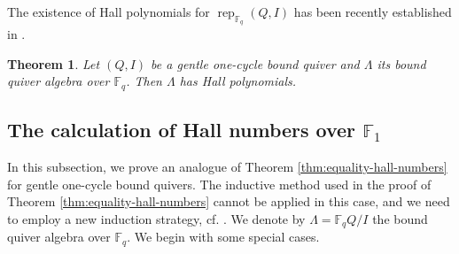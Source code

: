 \documentclass[12pt]{amsart}
\newtheorem{theorem}{Theorem}[section]
\theoremstyle{remark}
\theoremstyle{definition}
\numberwithin{equation}{section}
\begin{document}
The existence of Hall polynomials for $\operatorname{rep}_{\mathbb{F}_q}(Q,I)$ has been recently established in \cite{CY24}.
\begin{theorem}\cite[Theorem 1.1]{CY24}
    Let $(Q,I)$ be a gentle one-cycle bound quiver and $\Lambda$ its bound quiver algebra over $\mathbb{F}_q$. Then $\Lambda$ has Hall polynomials.
\end{theorem}



\subsection{The calculation of Hall numbers over $\mathbb{F}_1$ }
In this subsection, we prove an analogue of Theorem \ref{thm:equality-hall-numbers} for gentle one-cycle bound quivers.
The inductive method used in the proof of Theorem \ref{thm:equality-hall-numbers} cannot be applied in this case, and we need to employ a new induction strategy, cf. \cite{GP97,Zhang}. We denote by $\Lambda=\mathbb{F}_qQ/I$ the bound quiver algebra over $\mathbb{F}_q$.
We begin with some special cases.
\end{document}
